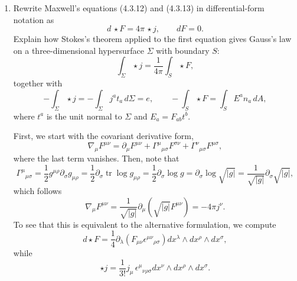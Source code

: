 \begin{enumerate}[label=\alph*)]
    \item Rewrite Maxwell's equations (4.3.12) and (4.3.13) in differential-form
    notation as
    \begin{equation}
        d\,\star F=4\pi\,\star j,
        \qquad
        dF=0.
    \end{equation}
    Explain how Stokes's theorem applied to the first equation gives Gauss's law
    on a three-dimensional hypersurface $\Sigma$ with boundary $S$:
    \begin{equation}
        \int_\Sigma\star j
        =\frac{1}{4\pi}\int_S\star F,
    \end{equation}
    together with
    \begin{equation}
        -\int_\Sigma\star j
        =-\int_\Sigma j^a t_a\,d\Sigma=e,
        \qquad
        -\int_S\star F
        =\int_S E^a n_a\,dA,
    \end{equation}
    where $t^a$ is the unit normal to $\Sigma$ and $E_a=F_{ab}t^b$.
    \begin{solution}
        First, we start with the covariant derivative form,
        \begin{equation}
            \nabla_\mu F^{\mu\nu} = \partial_\mu F^{\mu\nu} + \Gamma^\mu{}_{\mu\sigma}F^{\sigma \nu} + \Gamma^\nu{}_{\mu\sigma}F^{\mu\sigma},
        \end{equation}
        where the last term vanishes. Then, note that
        \begin{equation}
        \Gamma^\mu{}_{\mu\sigma} = \frac{1}{2}g^{\mu\rho}\partial_\sigma g_{\mu\rho} = \frac{1}{2}\partial_\sigma\operatorname{tr} \log g_{\mu\rho} = \frac{1}{2}\partial_\sigma \log g = \partial_\sigma \log \sqrt{|g|} =\frac{1}{\sqrt{|g|}}\partial_\sigma\sqrt{|g|},
        \end{equation}
        which follows
        \begin{equation}
            \nabla_\mu F^{\mu\nu} = \frac{1}{\sqrt{|g|}}\partial_\mu\left(\sqrt{|g|}F^{\mu\nu}\right) = -4\pi j^\nu.
        \end{equation}
        To see that this is equivalent to the alternative formulation, we compute
        \begin{equation}
            d\star F = \frac14\partial_\lambda\left(F_{\mu\nu}\epsilon^{\mu\nu}{}_{\rho\sigma}\right)dx^\lambda\wedge dx^\rho\wedge dx^\sigma,
        \end{equation}
        while
        \begin{equation}
\star j
=
\frac{1}{3!}
j_\mu\,
\epsilon^{\mu}{}_{\nu\rho\sigma}
dx^\nu\wedge dx^\rho\wedge dx^\sigma.

\end{equation}
\end{solution}
\end{enumerate}
